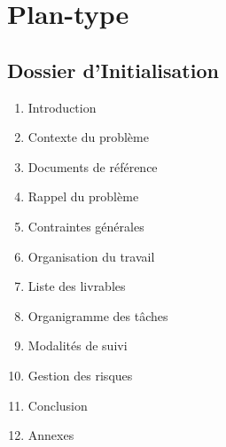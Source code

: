 \section{Plan-type}

\subsection{Dossier d'Initialisation}

\begin{enumerate}
\item Introduction
\item Contexte du problème
\item Documents de référence
\item Rappel du problème
\item Contraintes générales
\item Organisation du travail
\item Liste des livrables
\item Organigramme des tâches
\item Modalités de suivi
\item Gestion des risques
\item Conclusion
\item Annexes
\end{enumerate}

